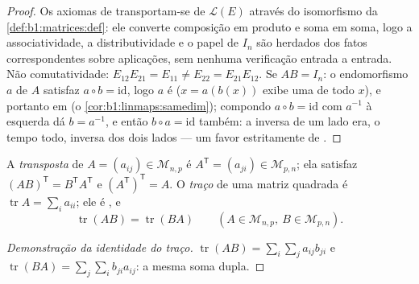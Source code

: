 \begin{proof}
Os axiomas de  transportam-se de $\mathcal{L}(E)$ através do isomorfismo da
\cref{def:b1:matrices:def}: ele converte composição em produto e soma em soma, logo a
associatividade, a distributividade e o papel de $I_n$ são herdados
dos fatos correspondentes sobre aplicações, sem nenhuma verificação
entrada a entrada. Não comutatividade: $E_{12}E_{21} = E_{11} \neq E_{22}
= E_{21}E_{12}$. Se $AB = I_n$: o
endomorfismo $a$ de $A$ satisfaz $a \circ b = \mathrm{id}$, logo $a$ é 
($x =
a(b(x))$ exibe uma  de todo $x$), e portanto  em
 (o \cref{cor:b1:linmaps:samedim}); compondo $a
\circ b = \mathrm{id}$ com $a^{-1}$ à esquerda dá
$b =
a^{-1}$, e então $b\circ a = \mathrm{id}$ também: a inversa de um lado era, o tempo
todo, inversa dos dois lados --- um favor estritamente de .
\end{proof}

\begin{definition}\label{def:b1:matrices:transpose}
A \emph{transposta} de $A = (a_{ij}) \in \mathcal{M}_{n,p}$ é $A^{\mathsf T}
= (a_{ji}) \in \mathcal{M}_{p,n}$; ela satisfaz $(AB)^{\mathsf T} = B^{\mathsf T}
A^{\mathsf T}$ e $(A^{\mathsf T})^{\mathsf T} = A$. O
\emph{traço} de uma matriz quadrada é $\operatorname{tr} A
= \sum_i a_{ii}$; ele é
, e
\[
\operatorname{tr}(AB) = \operatorname{tr}(BA)
\qquad (A \in \mathcal{M}_{n,p},\ B \in \mathcal{M}_{p,n}).
\]
\end{definition}

\begin{proof}[Demonstração da identidade do traço]
$\operatorname{tr}(AB) = \sum_i \sum_j a_{ij} b_{ji}$ e $\operatorname{tr}(BA) = \sum_j \sum_i b_{ji} a_{ij}$: a mesma soma dupla.
\end{proof}

